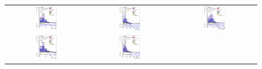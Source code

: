 \begin{figure}[tp]
  \centering
  \begin{tabular}{ccc}
  \includegraphics[width=0.27\textwidth]{Analysis/Figures_ttH/tesis_vars/prefit/lep_pt_6jetin4btagin.eps} &
  \includegraphics[width=0.27\textwidth]{Analysis/Figures_ttH/tesis_vars/prefit/met_6jetin4btagin.eps} &
  \includegraphics[width=0.27\textwidth]{Analysis/Figures_ttH/tesis_vars/prefit/WlepMT_6jetin4btagin.eps} \\
  \includegraphics[width=0.27\textwidth]{Analysis/Figures_ttH/tesis_vars/postfit/lep_pt_6jetin4btagin.eps} &
  \includegraphics[width=0.27\textwidth]{Analysis/Figures_ttH/tesis_vars/postfit/met_6jetin4btagin.eps} &

\end{tabular}
\end{figure}
